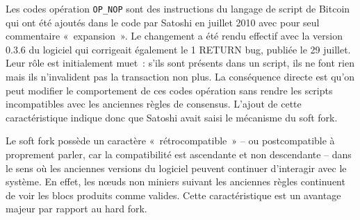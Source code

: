 Les codes opération \texttt{OP\_NOP} sont des instructions du langage de script de Bitcoin qui ont été ajoutés dans le code par Satoshi en juillet 2010 avec pour seul commentaire «~expansion~». Le changement a été rendu effectif avec la version 0.3.6 du logiciel qui corrigeait également le 1 RETURN bug, publiée le 29 juillet. Leur rôle est initialement muet~: s'ils sont présents dans un script, ils ne font rien mais ils n'invalident pas la transaction non plus. La conséquence directe est qu'on peut modifier le comportement de ces codes opération sans rendre les scripts incompatibles avec les anciennes règles de consensus. L'ajout de cette caractéristique indique donc que Satoshi avait saisi le mécanisme du soft fork.


Le soft fork possède un caractère «~rétrocompatible~» -- ou postcompatible à proprement parler, car la compatibilité est ascendante et non descendante -- dans le sens où les anciennes versions du logiciel peuvent continuer d'interagir avec le système. En effet, les nœuds non miniers suivant les anciennes règles continuent de voir les blocs produits comme valides. Cette caractéristique est un avantage majeur par rapport au hard fork.


